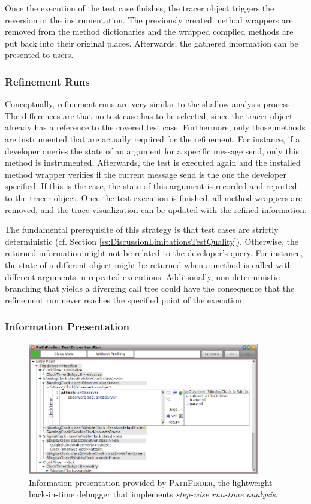 Once the execution of the test case finishes, the tracer object triggers the reversion of the instrumentation.
The previously created method wrappers are removed from the method dictionaries and the wrapped compiled methods are put back into their original places.
Afterwards, the gathered information can be presented to users.

\subsubsection{Refinement Runs}
Conceptually, refinement runs are very similar to the shallow analysis process.
The differences are that no test case has to be selected, since the tracer object already has a reference to the covered test case.
Furthermore, only those methods are instrumented that are actually required for the refinement.
For instance, if a developer queries the state of an argument for a specific message send, only this method is instrumented.
Afterwards, the test is executed again and the installed method wrapper verifies if the current message send is the one the developer specified.
If this is the case, the state of this argument is recorded and reported to the tracer object.
Once the test execution is finished, all method wrappers are removed, and the trace visualization can be updated with the refined information.

The fundamental prerequisite of this strategy is that test cases are strictly deterministic (cf. Section \ref{ss:DiscussionLimitationsTestQuality}).
Otherwise, the returned information might not be related to the developer's query.
For instance, the state of a different object might be returned when a method is called with different arguments in repeated executions.
Additionally, non-deterministic branching that yields a diverging call tree could have the consequence that the refinement run never reaches the specified point of the execution.

\subsubsection{Information Presentation}

\begin{figure}[tb]
	\centering
	\includegraphics[width=0.9\textwidth]{../images/02-TracingPathFinder}
	\caption[Information Presentation Provided by PathFinder]{Information presentation provided by \textsc{PathFinder}, the lightweight back-in-time debugger that implements \emph{step-wise run-time analysis}.}
	\label{fig:BackgroundPathFinder}
\end{figure}

